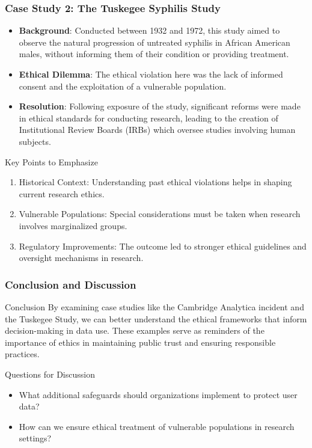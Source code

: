 \documentclass{beamer}
\begin{document}
\begin{frame}[fragile]
    \frametitle{Case Study 2: The Tuskegee Syphilis Study}
    \begin{itemize}
        \item \textbf{Background}: Conducted between 1932 and 1972, this study aimed to observe the natural progression of untreated syphilis in African American males, without informing them of their condition or providing treatment.
        \item \textbf{Ethical Dilemma}: The ethical violation here was the lack of informed consent and the exploitation of a vulnerable population.
        \item \textbf{Resolution}: Following exposure of the study, significant reforms were made in ethical standards for conducting research, leading to the creation of Institutional Review Boards (IRBs) which oversee studies involving human subjects.
    \end{itemize}
    
    \begin{block}{Key Points to Emphasize}
        \begin{enumerate}
            \item Historical Context: Understanding past ethical violations helps in shaping current research ethics.
            \item Vulnerable Populations: Special considerations must be taken when research involves marginalized groups.
            \item Regulatory Improvements: The outcome led to stronger ethical guidelines and oversight mechanisms in research.
        \end{enumerate}
    \end{block}
\end{frame}

\begin{frame}[fragile]
    \frametitle{Conclusion and Discussion}
    \begin{block}{Conclusion}
        By examining case studies like the Cambridge Analytica incident and the Tuskegee Study, we can better understand the ethical frameworks that inform decision-making in data use. 
        These examples serve as reminders of the importance of ethics in maintaining public trust and ensuring responsible practices.
    \end{block}

    \begin{block}{Questions for Discussion}
        \begin{itemize}
            \item What additional safeguards should organizations implement to protect user data?
            \item How can we ensure ethical treatment of vulnerable populations in research settings?
        \end{itemize}
    \end{block}
\end{frame}
\end{document}

